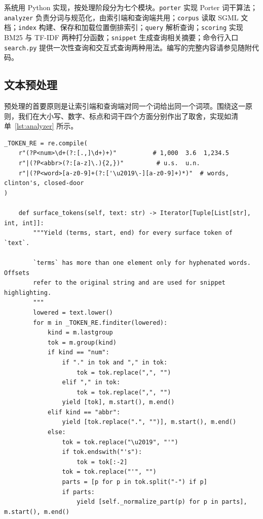 \documentclass[12pt,a4paper]{ctexart}
\begin{document}
系统用 Python 实现，按处理阶段分为七个模块。\texttt{porter} 实现 Porter 词干算法；\texttt{analyzer} 负责分词与规范化，由索引端和查询端共用；\texttt{corpus} 读取 SGML 文档；\texttt{index} 构建、保存和加载位置倒排索引；\texttt{query} 解析查询；\texttt{scoring} 实现 BM25 与 TF-IDF 两种打分函数；\texttt{snippet} 生成查询相关摘要；命令行入口 \texttt{search.py} 提供一次性查询和交互式查询两种用法。编写的完整内容请参见随附代码。

\subsection{文本预处理}

预处理的首要原则是让索引端和查询端对同一个词给出同一个词项。围绕这一原则，我们在大小写、数字、标点和词干四个方面分别作出了取舍，实现如清单~\ref{lst:analyzer} 所示。

\begin{lstlisting}[caption={分析器的分词正则与规范化逻辑}, label={lst:analyzer}]
_TOKEN_RE = re.compile(
    r"(?P<num>\d+(?:[.,]\d+)+)"          # 1,000  3.6  1,234.5
    r"|(?P<abbr>(?:[a-z]\.){2,})"         # u.s.  u.n.
    r"|(?P<word>[a-z0-9]+(?:['\u2019\-][a-z0-9]+)*)"  # words, clinton's, closed-door
)

    def surface_tokens(self, text: str) -> Iterator[Tuple[List[str], int, int]]:
        """Yield (terms, start, end) for every surface token of `text`.

        `terms` has more than one element only for hyphenated words. Offsets
        refer to the original string and are used for snippet highlighting.
        """
        lowered = text.lower()
        for m in _TOKEN_RE.finditer(lowered):
            kind = m.lastgroup
            tok = m.group(kind)
            if kind == "num":
                if "." in tok and "," in tok:
                    tok = tok.replace(",", "")
                elif "," in tok:
                    tok = tok.replace(",", "")
                yield [tok], m.start(), m.end()
            elif kind == "abbr":
                yield [tok.replace(".", "")], m.start(), m.end()
            else:
                tok = tok.replace("\u2019", "'")
                if tok.endswith("'s"):
                    tok = tok[:-2]
                tok = tok.replace("'", "")
                parts = [p for p in tok.split("-") if p]
                if parts:
                    yield [self._normalize_part(p) for p in parts], m.start(), m.end()
\end{lstlisting}
\end{document}
